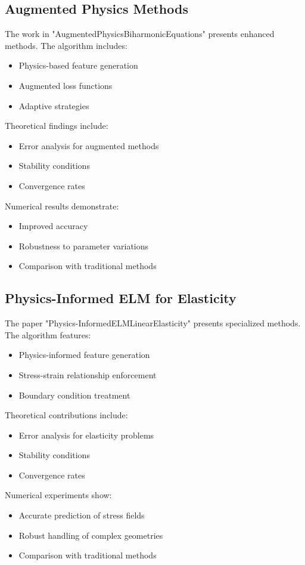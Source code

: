 \documentclass[12pt]{article}
\begin{document}
\subsection{Augmented Physics Methods}
\label{subsec:augmented}
The work in "AugmentedPhysicsBiharmonicEquations" presents enhanced methods. The algorithm includes:
\begin{itemize}
    \item Physics-based feature generation
    \item Augmented loss functions
    \item Adaptive strategies
\end{itemize}
Theoretical findings include:
\begin{itemize}
    \item Error analysis for augmented methods
    \item Stability conditions
    \item Convergence rates
\end{itemize}
Numerical results demonstrate:
\begin{itemize}
    \item Improved accuracy
    \item Robustness to parameter variations
    \item Comparison with traditional methods
\end{itemize}

\subsection{Physics-Informed ELM for Elasticity}
\label{subsec:elasticity}
The paper "Physics-InformedELMLinearElasticity" presents specialized methods. The algorithm features:
\begin{itemize}
    \item Physics-informed feature generation
    \item Stress-strain relationship enforcement
    \item Boundary condition treatment
\end{itemize}
Theoretical contributions include:
\begin{itemize}
    \item Error analysis for elasticity problems
    \item Stability conditions
    \item Convergence rates
\end{itemize}
Numerical experiments show:
\begin{itemize}
    \item Accurate prediction of stress fields
    \item Robust handling of complex geometries
    \item Comparison with traditional methods
\end{itemize}
\end{document}
